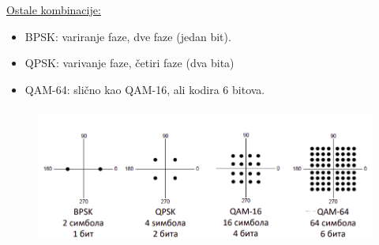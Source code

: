 \documentclass[a4paper]{article}
\begin{document}
            \underline{Ostale kombinacije:}
            \begin{itemize}
                \item BPSK: variranje faze, dve faze (jedan bit).
                \item QPSK: varivanje faze, četiri faze (dva bita)
                \item QAM-64: slično kao QAM-16, ali kodira 6 bitova.
            \end{itemize}
            \begin{figure}[H]
                \begin{center}
                    \includegraphics[width=120mm,height=45mm]{Slike/modulacija_preko_nosaca_primeri.png}
                \end{center}
            \end{figure}
\end{document}
